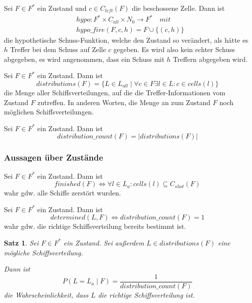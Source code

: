 \documentclass[a4paper,12pt]{llncs}
\numberwithin{equation}{section}
\newtheorem{satz}{Satz}
\begin{document}
\begin{definition}
Sei $F\in F^*$ ein Zustand und $c \in C_{left}(F)$ die beschossene Zelle.
Dann ist
\begin{align}
&hypo:F^*\times C_{all}\times N_0 \rightarrow F^* \quad mit \nonumber\\
&hypo\_fire(F, c, h)=F \cup \{(c, h)\}\nonumber
\end{align}
die hypothetische Schuss-Funktion, welche den Zustand so verändert, als hätte es $h$ Treffer bei dem Schuss auf Zelle $c$ gegeben. Es wird also kein echter Schuss abgegeben, es wird angenommen, dass ein Schuss mit $h$ Treffern abgegeben wird.
\end{definition}

\begin{definition}
Sei $F\in F^*$ ein Zustand.
Dann ist
\[
distributions(F)=\{L\in L_{all} \mid \forall c\in F\exists l\in L : c\in cells(l)\}
\]
die Menge aller Schiffsverteilungen, auf die die Treffer-Informationen vom Zustand $F$ zutreffen.
In anderen Worten, die Menge an zum Zustand $F$ noch möglichen Schiffsverteilungen.
\end{definition}

\begin{definition}
Sei $F\in F^*$ ein Zustand.
Dann ist
\[
distribution\_count(F)=|distributions(F)|
\]
\end{definition}

\subsubsection{Aussagen über Zustände}

\begin{definition}
Sei $F\in F^*$ ein Zustand.
Dann ist
\[
finished(F) \Leftrightarrow \forall l \in L_a \colon cells(l) \subseteq C_{shot}(F)
\]
wahr gdw. alle Schiffe zerstört wurden.
\end{definition}

\begin{definition}
Sei $F\in F^*$ ein Zustand.
Dann ist
\[
determined(L, F) \Leftrightarrow distribution\_count(F)=1
\]
wahr gdw. die richtige Schiffsverteilung bereits bestimmt ist.
\end{definition}


\begin{satz}
Sei $F\in F^*$ ein Zustand.
Sei außerdem $L \in distributions(F)$ eine mögliche Schiffsverteilung.

Dann ist
\[
P(L = L_a \mid F)=\frac{1}{distribution\_count(F)}
\]
die Wahrscheinlichkeit, dass $L$ die richtige Schiffsverteilung ist.
\end{satz}
\end{document}

